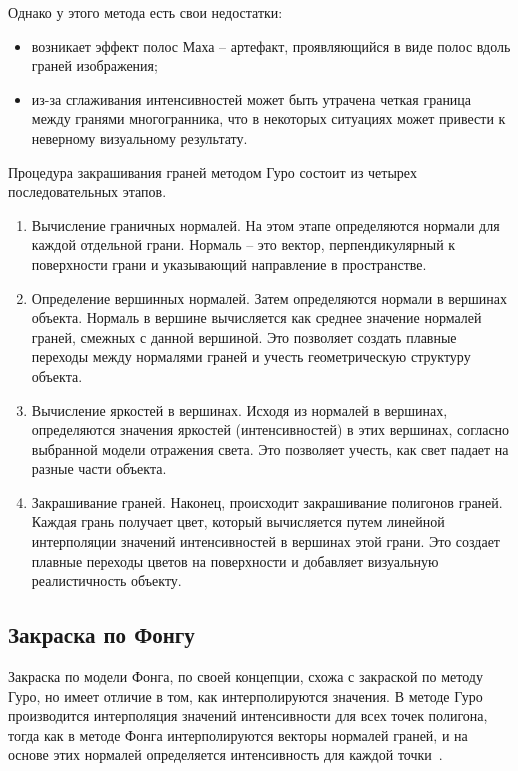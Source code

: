 Однако у этого метода есть свои недостатки:
\begin{itemize}
    \item возникает эффект полос Маха -- артефакт, проявляющийся в виде полос вдоль граней изображения;
    \item из-за сглаживания интенсивностей может быть утрачена четкая граница между гранями многогранника, что в некоторых ситуациях может привести к неверному визуальному результату.
\end{itemize}

Процедура закрашивания граней методом Гуро состоит из четырех последовательных этапов.
\begin{enumerate}
    \item Вычисление граничных нормалей. 
    На этом этапе определяются нормали для каждой отдельной грани. 
    Нормаль -- это вектор, перпендикулярный к поверхности грани и указывающий направление в пространстве.
    \item Определение вершинных нормалей. 
    Затем определяются нормали в вершинах объекта. 
    Нормаль в вершине вычисляется как среднее значение нормалей граней, смежных с данной вершиной. 
    Это позволяет создать плавные переходы между нормалями граней и учесть геометрическую структуру объекта.
    \item Вычисление яркостей в вершинах. 
    Исходя из нормалей в вершинах, определяются значения яркостей (интенсивностей) в этих вершинах, согласно выбранной модели отражения света. 
    Это позволяет учесть, как свет падает на разные части объекта.
    \item Закрашивание граней. 
    Наконец, происходит закрашивание полигонов граней. 
    Каждая грань получает цвет, который вычисляется путем линейной интерполяции значений интенсивностей в вершинах этой грани. 
    Это создает плавные переходы цветов на поверхности и добавляет визуальную реалистичность объекту.
\end{enumerate}

\subsection{Закраска по Фонгу}

Закраска по модели Фонга, по своей концепции, схожа с закраской по методу Гуро, но имеет отличие в том, как интерполируются значения. 
В методе Гуро производится интерполяция значений интенсивности для всех точек полигона, тогда как в методе Фонга интерполируются векторы нормалей граней, и на основе этих нормалей определяется интенсивность для каждой точки~\cite{phong}.

